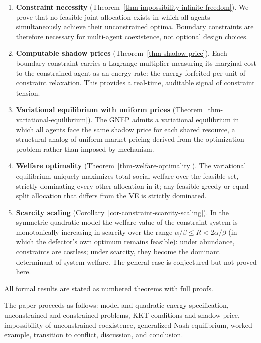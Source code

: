 \documentclass[11pt]{article}
\theoremstyle{plain}
\theoremstyle{definition}
\theoremstyle{remark}
\begin{document}
\begin{enumerate}
\def\labelenumi{\arabic{enumi}.}
\item
  \textbf{Constraint necessity}
  (Theorem~\ref{thm-impossibility-infinite-freedom}). We prove that no
  feasible joint allocation exists in which all agents simultaneously
  achieve their unconstrained optima. Boundary constraints are therefore
  necessary for multi-agent coexistence, not optional design choices.
\item
  \textbf{Computable shadow prices} (Theorem~\ref{thm-shadow-price}).
  Each boundary constraint carries a Lagrange multiplier measuring its
  marginal cost to the constrained agent as an energy rate: the energy
  forfeited per unit of constraint relaxation. This provides a
  real-time, auditable signal of constraint tension.
\item
  \textbf{Variational equilibrium with uniform prices}
  (Theorem~\ref{thm-variational-equilibrium}). The GNEP admits a
  variational equilibrium in which all agents face the same shadow price
  for each shared resource, a structural analog of uniform market
  pricing derived from the optimization problem rather than imposed by
  mechanism.
\item
  \textbf{Welfare optimality} (Theorem~\ref{thm-welfare-optimality}).
  The variational equilibrium uniquely maximizes total social welfare
  over the feasible set, strictly dominating every other allocation in
  it; any feasible greedy or equal-split allocation that differs from
  the VE is strictly dominated.
\item
  \textbf{Scarcity scaling}
  (Corollary~\ref{cor-constraint-scarcity-scaling}). In the symmetric
  quadratic model the welfare value of the constraint system is
  monotonically increasing in scarcity over the range
  \(\alpha/\beta \leq R < 2\alpha/\beta\) (in which the defector's own
  optimum remains feasible): under abundance, constraints are costless;
  under scarcity, they become the dominant determinant of system
  welfare. The general case is conjectured but not proved here.
\end{enumerate}

All formal results are stated as numbered theorems with full proofs.

The paper proceeds as follows: model and quadratic energy specification,
unconstrained and constrained problems, KKT conditions and shadow price,
impossibility of unconstrained coexistence, generalized Nash
equilibrium, worked example, transition to conflict, discussion, and
conclusion.
\end{document}
